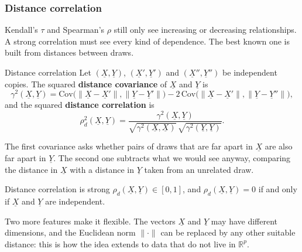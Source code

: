 \documentclass[a4paper,12pt,oneside]{report}
\begin{document}
\subsubsection{Distance correlation}

Kendall's $\tau$ and Spearman's $\rho$ still only see increasing or
decreasing relationships. A strong correlation must see every kind of
dependence. The best known one is built from distances between draws.

\begin{frameddefn}{Distance correlation}\label{def:distance-correlation}
Let $(\underline{X},\underline{Y})$, $(\underline{X}',\underline{Y}')$
and $(\underline{X}'',\underline{Y}'')$ be independent copies. The squared
\textbf{distance covariance} of $\underline{X}$ and $\underline{Y}$ is
\[
\gamma^2(\underline{X},\underline{Y})
=\mathrm{Cov}\big(\|\underline{X}-\underline{X}'\|,\|\underline{Y}-\underline{Y}'\|\big)
-2\,\mathrm{Cov}\big(\|\underline{X}-\underline{X}'\|,\|\underline{Y}-\underline{Y}''\|\big),
\]
and the squared \textbf{distance correlation} is
\[
\rho^2_{d}(\underline{X},\underline{Y})
=\frac{\gamma^2(\underline{X},\underline{Y})}{\sqrt{\gamma^2(\underline{X},\underline{X})}\,\sqrt{\gamma^2(\underline{Y},\underline{Y})}}.
\]
\end{frameddefn}

The first covariance asks whether pairs of draws that are far apart in
$\underline{X}$ are also far apart in $\underline{Y}$. The second one
subtracts what we would see anyway, comparing the distance in
$\underline{X}$ with a distance in $\underline{Y}$ taken from an unrelated
draw.

\begin{framedthm}{Distance correlation is strong}\label{thm:dcor-strong}
$\rho_d(\underline{X},\underline{Y})\in[0,1]$, and
$\rho_d(\underline{X},\underline{Y})=0$ if and only if $\underline{X}$ and
$\underline{Y}$ are independent.
\end{framedthm}

Two more features make it flexible. The vectors $\underline{X}$ and
$\underline{Y}$ may have different dimensions, and the Euclidean norm
$\|\cdot\|$ can be replaced by any other suitable distance: this is how
the idea extends to data that do not live in $\mathbb{R}^p$.
\end{document}
